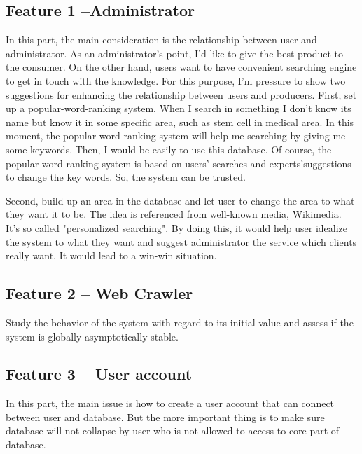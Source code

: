 \documentclass[a4paper]{article} %
\begin{document}
\subsection*{Feature 1 --Administrator}
\label{task1:part1}

In this part, the main consideration is the relationship between user and administrator. As an administrator's point, I'd like to give the best product to the consumer. On the other hand, users want to have convenient searching engine to get in touch with the knowledge. For this purpose, I'm pressure to show two suggestions for enhancing the relationship between users and producers. First, set up a popular-word-ranking system. When I search in something I don't know its name but know it in some specific area, such as stem cell in medical area. In this moment, the popular-word-ranking system will help me searching by giving me some keywords. Then, I would be easily to use this database. Of course, the popular-word-ranking system is based on users' searches and experts'suggestions to change the key words. So, the system can be trusted. 

Second, build up an area in the database and let user to change the area to what they want it to be. The idea is referenced from well-known media, Wikimedia. It's so called "personalized searching". By doing this, it would help user idealize the system to what they want and suggest administrator the service which clients really want. It would lead to a win-win situation.

\subsection*{Feature 2 -- Web Crawler}
\label{task1:feature2}

Study the behavior of the system with regard to its initial value and assess if the system is globally asymptotically stable.
 
\subsection*{Feature 3 -- User account}
\label{task1:feature3}

In this part, the main issue is how to create a user account that can connect between user and database. But the more important thing is to make sure database will not collapse by user who is not allowed to access to core part of database.
\end{document}
